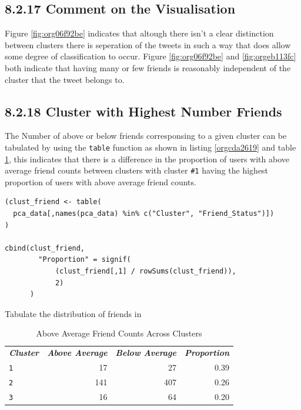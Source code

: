 \documentclass[11pt]{article}
\begin{document}
\subsection{8.2.17 Comment on the Visualisation}
\label{sec:org79cc43b}
Figure \ref{fig:org06f92be} indicates that altough there isn't a clear distinction between
clusters there is seperation of the tweets in such a way that does allow some
degree of classification to occur. Figure \ref{fig:org06f92be} and \ref{fig:orgeb113fc} both indicate that having
many or few friends is reasonably independent of the cluster that the tweet
belongs to.
\subsection{8.2.18 Cluster with Highest Number Friends}
\label{sec:orgf793a4b}
The Number of above or below friends corresponsing to a given cluster can be tabulated by using the \texttt{table} function as shown in listing \ref{orgcda2619} and table \ref{tab:org369b3cb}, this indicates that there is a difference in the proportion of users with above average friend counts between clusters with cluster \texttt{\#1} having the highest proportion of users with above average friend counts.

\begin{listing}[htbp]
\begin{verbatim}
(clust_friend <- table(
  pca_data[,names(pca_data) %in% c("Cluster", "Friend_Status")])
)

cbind(clust_friend,
        "Proportion" = signif(
            (clust_friend[,1] / rowSums(clust_friend)),
            2)
      )
\end{verbatim}
\caption{\label{orgcda2619}Tabulate the distribution of friends in}
\end{listing}

\begin{table}[htbp]
\caption{\label{tab:org369b3cb}Above Average Friend Counts Across Clusters}
\centering
\begin{tabular}{lrrr}
\textbf{\emph{Cluster}} & \textbf{\emph{Above Average}} & \textbf{\emph{Below Average}} & \textbf{\emph{Proportion}}\\
\texttt{1} & 17 & 27 & 0.39\\
\texttt{2} & 141 & 407 & 0.26\\
\texttt{3} & 16 & 64 & 0.20\\
\end{tabular}
\end{table}
\end{document}
